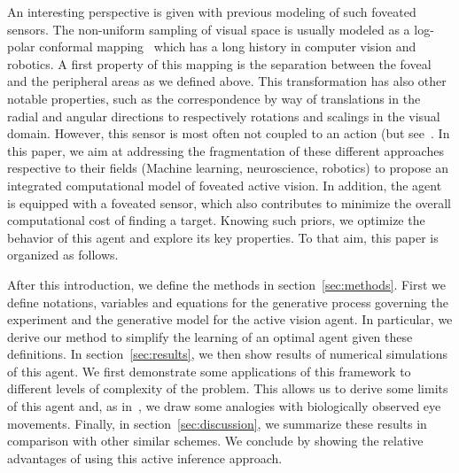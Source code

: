 An interesting perspective is given with previous modeling of such foveated sensors. The non-uniform sampling of visual space is usually modeled as a log-polar conformal mapping~\citep{Traver10} which has a long history in computer vision and robotics. A first property of this mapping is the separation between the foveal and the peripheral areas as we defined above. This transformation has also other notable properties, such as the correspondence by way of translations in the radial and angular directions to respectively rotations and scalings in the visual domain. However, this sensor is most often not coupled to an action (but see~\citep{ref_needed)}. In this paper, we aim at addressing the fragmentation of these different approaches respective to their fields (Machine learning, neuroscience, robotics) to propose an integrated computational model of foveated active vision.
In addition,  the agent is equipped with a foveated sensor, %
which also contributes to minimize the overall computational cost of finding a target. Knowing such priors, we optimize the behavior of this agent and explore its key properties.
To that aim, this paper is organized as follows.

After this introduction, we define the methods in section~\ref{sec:methods}. First we  define notations, variables and equations for the generative process governing the experiment and the generative model for the active vision agent. In particular, we  derive our method to simplify the learning of an optimal agent given these definitions. In section~\ref{sec:results}, we  then show results of numerical simulations of this agent. We  first demonstrate some applications of this framework to different levels of complexity of the problem. This  allows us to derive some limits of this agent and, as in~\citep{Najemnik05}, we  draw some analogies with biologically observed eye movements. Finally, in section~\ref{sec:discussion}, we  summarize these results in comparison with other similar schemes. We  conclude by showing the relative advantages of using this active inference approach.
